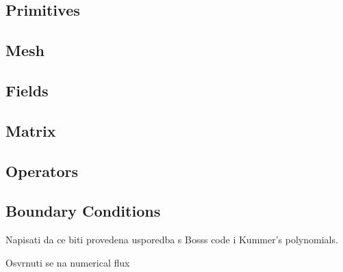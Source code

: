 \documentclass[11pt, a4paper]{article}
\begin{document}
\subsection{Primitives}

\subsection{Mesh}

\subsection{Fields}

\subsection{Matrix}
\subsection{Operators}
\subsection{Boundary Conditions}

Napisati da ce biti provedena usporedba s Bosss code i Kummer's polynomials.

Osvrnuti se na numerical flux


\pagebreak


%
\end{document}
